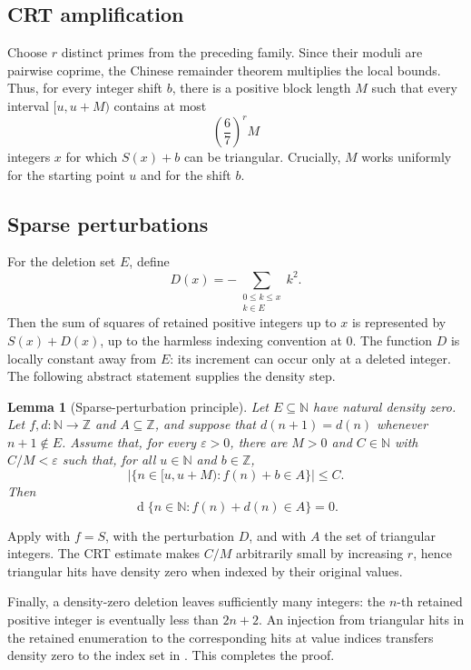 \documentclass[11pt]{article}
\newtheorem{lemma}[theorem]{Lemma}
\theoremstyle{definition}
\theoremstyle{remark}
\newcommand{\N}{\mathbb{N}}
\newcommand{\Z}{\mathbb{Z}}
\newcommand{\card}[1]{\lvert #1\rvert}
\newcommand{\dens}{\operatorname{d}}
\begin{document}
\subsection{CRT amplification}

Choose $r$ distinct primes from the preceding family.  Since their moduli are
pairwise coprime, the Chinese remainder theorem multiplies the local bounds.
Thus, for every integer shift $b$, there is a positive block length $M$ such
that every interval $[u,u+M)$ contains at most
\[
  \left(\frac67\right)^rM
\]
integers $x$ for which $S(x)+b$ can be triangular.  Crucially, $M$ works
uniformly for the starting point $u$ and for the shift $b$.

\subsection{Sparse perturbations}

For the deletion set $E$, define
\[
  D(x)=-\sum_{\substack{0\leq k\leq x\\ k\in E}}k^2.
\]
Then the sum of squares of retained positive integers up to $x$ is represented
by $S(x)+D(x)$, up to the harmless indexing convention at $0$.  The function
$D$ is locally constant away from $E$: its increment can occur only at a
deleted integer.  The following abstract statement supplies the density step.

\begin{lemma}[Sparse-perturbation principle]\label{lem:perturbation}
Let $E\subseteq\N$ have natural density zero.  Let $f,d:\N\to\Z$ and
$A\subseteq\Z$, and suppose that $d(n+1)=d(n)$ whenever $n+1\notin E$.
Assume that, for every $\varepsilon>0$, there are $M>0$ and $C\in\N$ with
$C/M<\varepsilon$ such that, for all $u\in\N$ and $b\in\Z$,
\[
  \card{\{n\in [u,u+M):f(n)+b\in A\}}\leq C.
\]
Then
\[
  \dens\{n\in\N:f(n)+d(n)\in A\}=0.
\]
\end{lemma}

Apply  with $f=S$, with the perturbation $D$, and
with $A$ the set of triangular integers.  The CRT estimate makes $C/M$
arbitrarily small by increasing $r$, hence triangular hits have density zero
when indexed by their original values.

Finally, a density-zero deletion leaves sufficiently many integers: the
$n$-th retained positive integer is eventually less than $2n+2$.  An injection
from triangular hits in the retained enumeration to the corresponding hits at
value indices transfers density zero to the index set in .
This completes the proof.
\end{document}
